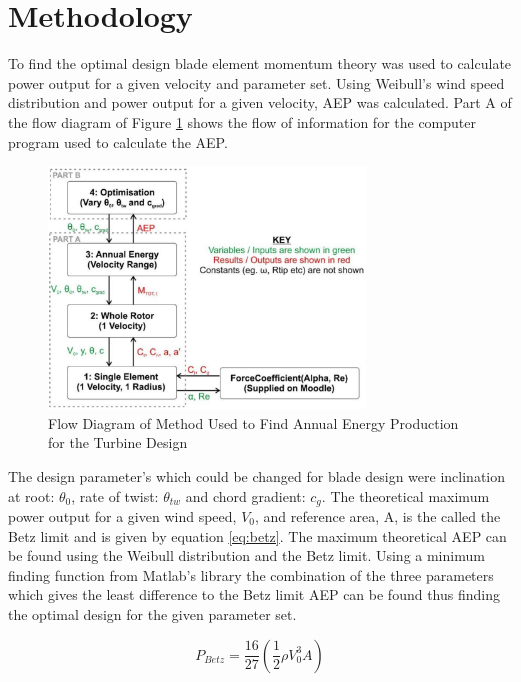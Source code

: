 \documentclass[11pt]{article}
\begin{document}
\section{Methodology}

To find the optimal design blade element momentum theory was used to calculate power output for a given velocity and parameter set. Using Weibull's wind speed distribution and power output for a given velocity, AEP was calculated. Part A of the flow diagram of Figure \ref{fig:handoutflow} shows the flow of information for the computer program used to calculate the AEP.\\

\begin{figure}[h!]
	\includegraphics[width=0.75\textwidth]{HandoutFlow}
	\caption{Flow Diagram of Method Used to Find Annual Energy Production for the Turbine Design \cite{handout}}\label{fig:handoutflow}
\end{figure}

The design parameter's which could be changed for blade design were inclination at root: $\theta_0$, rate of twist: $\theta_{tw}$ and chord gradient: $c_g$. The theoretical maximum power output for a given wind speed, $V_0$, and reference area, A, is the called the Betz limit and is given by equation \ref{eq:betz}. The maximum theoretical AEP can be found using the Weibull distribution and the Betz limit. Using a minimum finding function from Matlab's library the combination of the three parameters which gives the least difference to the Betz limit AEP can be found thus finding the optimal design for the given parameter set.

\begin{equation}
	\label{eq:betz}
	P_{Betz} = \frac{16}{27} \left ( \frac{1}{2} \rho V_0^3 A \right )
\end{equation}
\FloatBarrier
\end{document}
